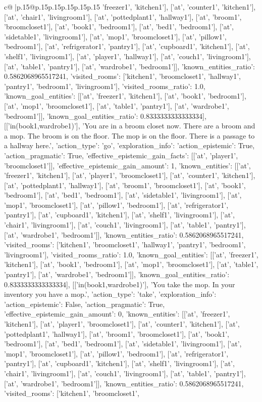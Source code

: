 \documentclass{article}
\begin{document}
{\begin{supertabular}{c@{$\;$}|p{.15\linewidth}@{}p{.15\linewidth}p{.15\linewidth}p{.15\linewidth}p{.15\linewidth}p{.15\linewidth}}
{{{'freezer1', 'kitchen1'], ['at', 'counter1', 'kitchen1'], ['at', 'chair1', 'livingroom1'], ['at', 'pottedplant1', 'hallway1'], ['at', 'broom1', 'broomcloset1'], ['at', 'book1', 'bedroom1'], ['at', 'bed1', 'bedroom1'], ['at', 'sidetable1', 'livingroom1'], ['at', 'mop1', 'broomcloset1'], ['at', 'pillow1', 'bedroom1'], ['at', 'refrigerator1', 'pantry1'], ['at', 'cupboard1', 'kitchen1'], ['at', 'shelf1', 'livingroom1'], ['at', 'player1', 'hallway1'], ['at', 'couch1', 'livingroom1'], ['at', 'table1', 'pantry1'], ['at', 'wardrobe1', 'bedroom1']], 'known_entities_ratio': 0.5862068965517241, 'visited_rooms': ['kitchen1', 'broomcloset1', 'hallway1', 'pantry1', 'bedroom1', 'livingroom1'], 'visited_rooms_ratio': 1.0, 'known_goal_entities': [['at', 'freezer1', 'kitchen1'], ['at', 'book1', 'bedroom1'], ['at', 'mop1', 'broomcloset1'], ['at', 'table1', 'pantry1'], ['at', 'wardrobe1', 'bedroom1']], 'known_goal_entities_ratio': 0.8333333333333334}}], [['in(book1,wardrobe1)'], 'You are in a broom closet now. There are a broom and a mop. The broom is on the floor. The mop is on the floor. There is a passage to a hallway here.', {'action_type': 'go', 'exploration_info': {'action_epistemic': True, 'action_pragmatic': True, 'effective_epistemic_gain_facts': [['at', 'player1', 'broomcloset1']], 'effective_epistemic_gain_amount': 1, 'known_entities': [['at', 'freezer1', 'kitchen1'], ['at', 'player1', 'broomcloset1'], ['at', 'counter1', 'kitchen1'], ['at', 'pottedplant1', 'hallway1'], ['at', 'broom1', 'broomcloset1'], ['at', 'book1', 'bedroom1'], ['at', 'bed1', 'bedroom1'], ['at', 'sidetable1', 'livingroom1'], ['at', 'mop1', 'broomcloset1'], ['at', 'pillow1', 'bedroom1'], ['at', 'refrigerator1', 'pantry1'], ['at', 'cupboard1', 'kitchen1'], ['at', 'shelf1', 'livingroom1'], ['at', 'chair1', 'livingroom1'], ['at', 'couch1', 'livingroom1'], ['at', 'table1', 'pantry1'], ['at', 'wardrobe1', 'bedroom1']], 'known_entities_ratio': 0.5862068965517241, 'visited_rooms': ['kitchen1', 'broomcloset1', 'hallway1', 'pantry1', 'bedroom1', 'livingroom1'], 'visited_rooms_ratio': 1.0, 'known_goal_entities': [['at', 'freezer1', 'kitchen1'], ['at', 'book1', 'bedroom1'], ['at', 'mop1', 'broomcloset1'], ['at', 'table1', 'pantry1'], ['at', 'wardrobe1', 'bedroom1']], 'known_goal_entities_ratio': 0.8333333333333334}}], [['in(book1,wardrobe1)'], 'You take the mop. In your inventory you have a mop.', {'action_type': 'take', 'exploration_info': {'action_epistemic': False, 'action_pragmatic': True, 'effective_epistemic_gain_amount': 0, 'known_entities': [['at', 'freezer1', 'kitchen1'], ['at', 'player1', 'broomcloset1'], ['at', 'counter1', 'kitchen1'], ['at', 'pottedplant1', 'hallway1'], ['at', 'broom1', 'broomcloset1'], ['at', 'book1', 'bedroom1'], ['at', 'bed1', 'bedroom1'], ['at', 'sidetable1', 'livingroom1'], ['at', 'mop1', 'broomcloset1'], ['at', 'pillow1', 'bedroom1'], ['at', 'refrigerator1', 'pantry1'], ['at', 'cupboard1', 'kitchen1'], ['at', 'shelf1', 'livingroom1'], ['at', 'chair1', 'livingroom1'], ['at', 'couch1', 'livingroom1'], ['at', 'table1', 'pantry1'], ['at', 'wardrobe1', 'bedroom1']], 'known_entities_ratio': 0.5862068965517241, 'visited_rooms': ['kitchen1', 'broomcloset1', }}}
\end{supertabular}}
\end{document}
